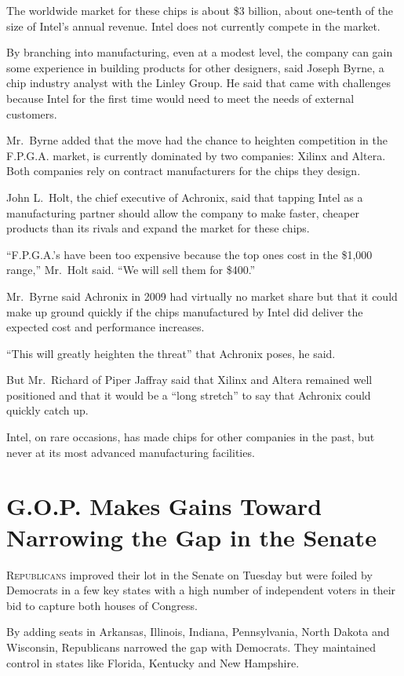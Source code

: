 ﻿\documentclass[12pt]{article}
\begin{document}
The worldwide market for these chips is about \$3 billion, about one-tenth of the size of Intel's
annual revenue. Intel does not currently compete in the market.

By branching into manufacturing, even at a modest level, the company can gain some experience in
building products for other designers, said Joseph Byrne, a chip industry analyst with the Linley
Group. He said that came with challenges because Intel for the first time would need to meet the
needs of external customers.

Mr.~Byrne added that the move had the chance to heighten competition in the F.P.G.A. market, is
currently dominated by two companies: Xilinx and Altera. Both companies rely on contract
manufacturers for the chips they design.

John L.~Holt, the chief executive of Achronix, said that tapping Intel as a manufacturing partner
should allow the company to make faster, cheaper products than its rivals and expand the market for
these chips.

``F.P.G.A.'s have been too expensive because the top ones cost in the \$1,000 range,'' Mr.~Holt
said. ``We will sell them for \$400.''

Mr.~Byrne said Achronix in 2009 had virtually no market share but that it could make up ground
quickly if the chips manufactured by Intel did deliver the expected cost and performance increases.

``This will greatly heighten the threat'' that Achronix poses, he said.

But Mr.~Richard of Piper Jaffray said that Xilinx and Altera remained well positioned and that it
would be a ``long stretch'' to say that
Achronix could quickly catch up.

Intel, on rare occasions, has made chips for other companies in the past, but never at its most
advanced manufacturing facilities.

\section{G.O.P. Makes Gains Toward Narrowing the Gap in the Senate}

\lettrine{R}{epublicans} improved their lot in the Senate on Tuesday but
were foiled by Democrats in a few key states with a high number of independent voters in their bid
to capture both houses of Congress.

By adding seats in Arkansas, Illinois, Indiana, Pennsylvania, North Dakota and Wisconsin,
Republicans narrowed the gap with Democrats. They maintained control in states like Florida,
Kentucky and New Hampshire.
\end{document}

